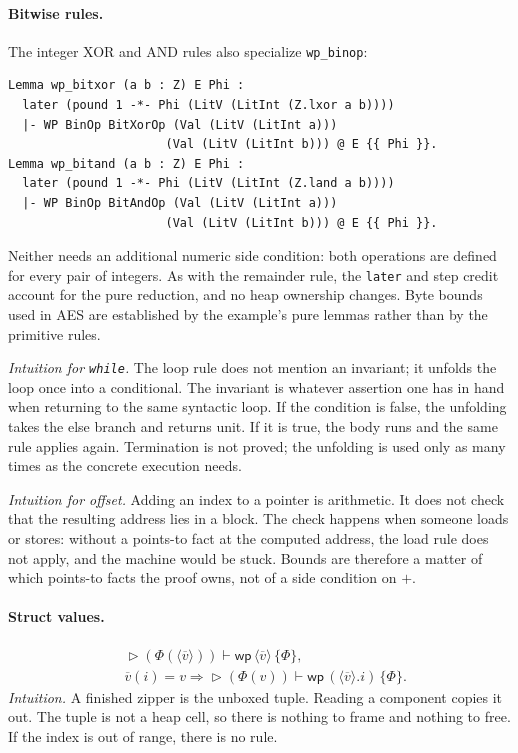 \documentclass[11pt]{article}
\newcommand{\later}{\mathop{\triangleright}}
\newcommand{\Wpre}{\mathsf{wp}}
\begin{document}
\paragraph{Bitwise rules.}
The integer XOR and AND rules also specialize \texttt{wp\_binop}:
\begin{lstlisting}
Lemma wp_bitxor (a b : Z) E Phi :
  later (pound 1 -*- Phi (LitV (LitInt (Z.lxor a b))))
  |- WP BinOp BitXorOp (Val (LitV (LitInt a)))
                      (Val (LitV (LitInt b))) @ E {{ Phi }}.
Lemma wp_bitand (a b : Z) E Phi :
  later (pound 1 -*- Phi (LitV (LitInt (Z.land a b))))
  |- WP BinOp BitAndOp (Val (LitV (LitInt a)))
                      (Val (LitV (LitInt b))) @ E {{ Phi }}.
\end{lstlisting}
Neither needs an additional numeric side condition: both operations are
defined for every pair of integers. As with the remainder rule, the
\texttt{later} and step credit account for the pure reduction, and no heap
ownership changes. Byte bounds used in AES are established by the example's
pure lemmas rather than by the primitive rules.

\textit{Intuition for \texttt{while}.}
The loop rule does not mention an invariant; it unfolds the loop once into a conditional.
The invariant is whatever assertion one has in hand when returning to the same syntactic loop.
If the condition is false, the unfolding takes the else branch and returns unit.
If it is true, the body runs and the same rule applies again.
Termination is not proved; the unfolding is used only as many times as the concrete execution needs.

\textit{Intuition for offset.}
Adding an index to a pointer is arithmetic.
It does not check that the resulting address lies in a block.
The check happens when someone loads or stores: without a points-to fact at the computed address, the load rule does not apply, and the machine would be stuck.
Bounds are therefore a matter of which points-to facts the proof owns, not of a side condition on \(+\).

\paragraph{Struct values.}
\[
\begin{aligned}
&\later(\Phi(\langle \overline{v}\rangle)) \vdash \Wpre\,\langle\overline{v}\rangle\,\{\Phi\},\\
&\overline{v}(i)=v \Rightarrow
  \later(\Phi(v)) \vdash \Wpre\,(\langle\overline{v}\rangle.i)\,\{\Phi\}.
\end{aligned}
\]
\textit{Intuition.}
A finished zipper is the unboxed tuple.
Reading a component copies it out.
The tuple is not a heap cell, so there is nothing to frame and nothing to free.
If the index is out of range, there is no rule.
\end{document}
